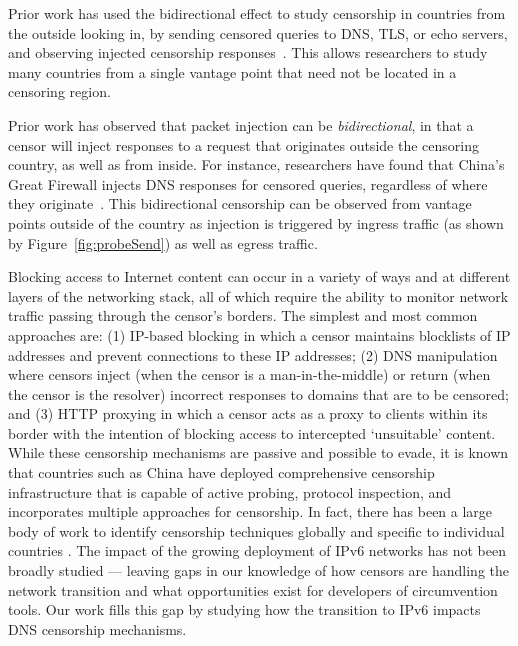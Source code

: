 Prior work has used the bidirectional effect to study censorship in countries from the outside
looking in, by sending censored queries to DNS, TLS, or echo servers, and
observing injected censorship
responses~\cite{vandersloot2018quack,pearce2017augur,pearce2017global,scott2016satellite,sundara2020censored}.
This allows researchers to study many countries from a single vantage point that
need not be located in a censoring region.


Prior work has observed that packet injection can be \emph{bidirectional}, in
that a censor will inject responses to a request that originates outside the
censoring country, as well as from inside. For instance, researchers have found
that China's Great Firewall injects DNS responses for censored queries,
regardless of where they originate~\cite{collateral-dns}. This bidirectional
censorship can be observed from vantage points outside of the country as
injection is triggered by ingress traffic (as shown by
Figure~\ref{fig:probeSend}) as well as egress traffic.


Blocking access to Internet content can occur in a variety of ways and at
different layers of the networking stack, all of which require the ability to
monitor network traffic passing through the censor's borders. The simplest and
most common approaches are: (1) IP-based blocking in which a censor maintains
blocklists of IP addresses and prevent connections to these IP addresses; (2)
DNS manipulation where censors inject (when the censor is a man-in-the-middle)
or return (when the censor is the resolver) incorrect responses to domains that
are to be censored; and (3) HTTP proxying in which a censor acts as a proxy to
clients within its border with the intention of blocking access to intercepted
`unsuitable' content.
%
While these censorship mechanisms are passive and possible to evade, it is
known that countries such as China have deployed comprehensive censorship
infrastructure that is capable of active probing, protocol inspection, and
incorporates multiple approaches for censorship.
%
In fact, there has been a large body of work to identify censorship techniques
globally
\cite{pearce2017global, niaki2020iclab, scott2016satellite,
sundara2020censored, filasto2012ooni, pearce2017augur, razaghpanah2016exploring}
and specific to individual countries \cite{USESEC21:GFWatch, aryan2013internet,
ramesh2020decentralized, yadav2018light, gebhart2017internet, nabi2013anatomy}.
%
The impact of the growing deployment of IPv6 networks has not been broadly
studied --- leaving gaps in our knowledge of how censors are handling the
network transition and what opportunities exist for developers of circumvention
tools. Our work fills this gap by studying how the transition to IPv6 impacts
DNS censorship mechanisms.


